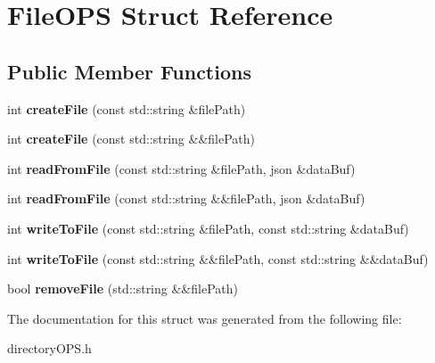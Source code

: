 \hypertarget{structFileOPS}{}\section{File\+O\+PS Struct Reference}
\label{structFileOPS}
\subsection*{Public Member Functions}
\begin{DoxyCompactItemize}
\item 
int {\bfseries create\+File} (const std\+::string \&file\+Path)\hypertarget{structFileOPS_aa6b67d55b39fd17e0ac350da391f7e27}{}\label{structFileOPS_aa6b67d55b39fd17e0ac350da391f7e27}

\item 
int {\bfseries create\+File} (const std\+::string \&\&file\+Path)\hypertarget{structFileOPS_a91114f44a43049272a5d7ceaf53e51d3}{}\label{structFileOPS_a91114f44a43049272a5d7ceaf53e51d3}

\item 
int {\bfseries read\+From\+File} (const std\+::string \&file\+Path, json \&data\+Buf)\hypertarget{structFileOPS_ad19ca376abfaa515e2c822c2d4371ada}{}\label{structFileOPS_ad19ca376abfaa515e2c822c2d4371ada}

\item 
int {\bfseries read\+From\+File} (const std\+::string \&\&file\+Path, json \&data\+Buf)\hypertarget{structFileOPS_aca9693c936cc1c5f2a7a7cb13da41325}{}\label{structFileOPS_aca9693c936cc1c5f2a7a7cb13da41325}

\item 
int {\bfseries write\+To\+File} (const std\+::string \&file\+Path, const std\+::string \&data\+Buf)\hypertarget{structFileOPS_a162e4094270c0280158300ddd4b7d9eb}{}\label{structFileOPS_a162e4094270c0280158300ddd4b7d9eb}

\item 
int {\bfseries write\+To\+File} (const std\+::string \&\&file\+Path, const std\+::string \&\&data\+Buf)\hypertarget{structFileOPS_abd0db6aa428666db86c855b7430e4ec3}{}\label{structFileOPS_abd0db6aa428666db86c855b7430e4ec3}

\item 
bool {\bfseries remove\+File} (std\+::string \&\&file\+Path)\hypertarget{structFileOPS_a555d3579d93d6407faccb002f59cde92}{}\label{structFileOPS_a555d3579d93d6407faccb002f59cde92}

\end{DoxyCompactItemize}


The documentation for this struct was generated from the following file\+:\begin{DoxyCompactItemize}
\item 
directory\+O\+P\+S.\+h\end{DoxyCompactItemize}
